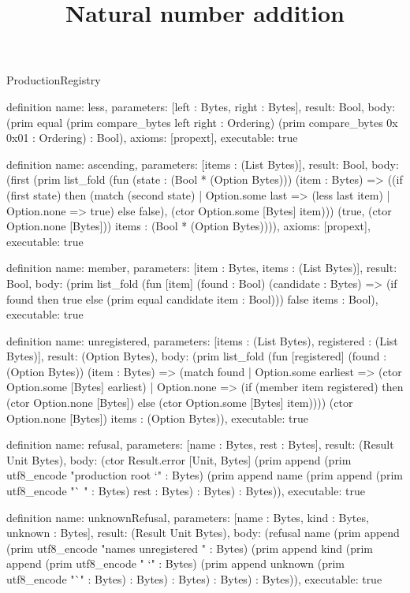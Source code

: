 \begin{lexlean}{ProductionRegistry}
\title{Natural number addition}
\begin{semanticmodule}
definition{
  name: less,
  parameters: [left : Bytes, right : Bytes],
  result: Bool,
  body: (prim equal (prim compare_bytes left right : Ordering) (prim compare_bytes 0x 0x01 : Ordering) : Bool),
  axioms: [propext],
  executable: true
}

definition{
  name: ascending,
  parameters: [items : (List Bytes)],
  result: Bool,
  body: (first (prim list_fold (fun (state : (Bool * (Option Bytes))) (item : Bytes) => ((if (first state) then (match (second state)
    | Option.some last => (less last item)
    | Option.none => true) else false), (ctor Option.some [Bytes] item))) (true, (ctor Option.none [Bytes])) items : (Bool * (Option Bytes)))),
  axioms: [propext],
  executable: true
}

definition{
  name: member,
  parameters: [item : Bytes, items : (List Bytes)],
  result: Bool,
  body: (prim list_fold (fun [item] (found : Bool) (candidate : Bytes) => (if found then true else (prim equal candidate item : Bool))) false items : Bool),
  executable: true
}

definition{
  name: unregistered,
  parameters: [items : (List Bytes), registered : (List Bytes)],
  result: (Option Bytes),
  body: (prim list_fold (fun [registered] (found : (Option Bytes)) (item : Bytes) => (match found
    | Option.some earliest => (ctor Option.some [Bytes] earliest)
    | Option.none => (if (member item registered) then (ctor Option.none [Bytes]) else (ctor Option.some [Bytes] item)))) (ctor Option.none [Bytes]) items : (Option Bytes)),
  executable: true
}

definition{
  name: refusal,
  parameters: [name : Bytes, rest : Bytes],
  result: (Result Unit Bytes),
  body: (ctor Result.error [Unit, Bytes] (prim append (prim utf8_encode "production root `" : Bytes) (prim append name (prim append (prim utf8_encode "` " : Bytes) rest : Bytes) : Bytes) : Bytes)),
  executable: true
}

definition{
  name: unknownRefusal,
  parameters: [name : Bytes, kind : Bytes, unknown : Bytes],
  result: (Result Unit Bytes),
  body: (refusal name (prim append (prim utf8_encode "names unregistered " : Bytes) (prim append kind (prim append (prim utf8_encode " `" : Bytes) (prim append unknown (prim utf8_encode "`" : Bytes) : Bytes) : Bytes) : Bytes) : Bytes)),
  executable: true
}


\end{semanticmodule}
\end{lexlean}
